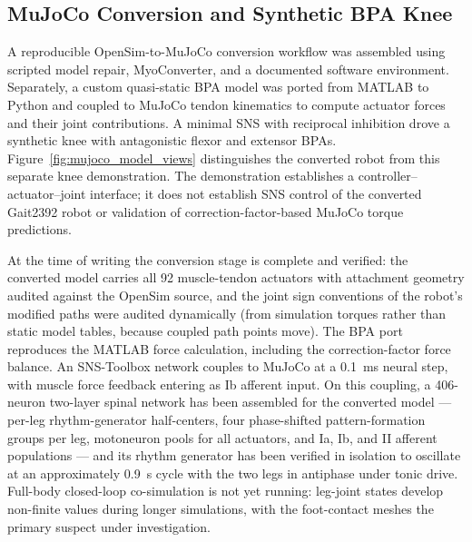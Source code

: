\subsection{MuJoCo Conversion and Synthetic BPA Knee}

A reproducible OpenSim-to-MuJoCo conversion workflow was assembled using scripted model repair, MyoConverter, and a documented software environment. Separately, a custom quasi-static BPA model was ported from MATLAB to Python and coupled to MuJoCo tendon kinematics to compute actuator forces and their joint contributions. A minimal SNS with reciprocal inhibition drove a synthetic knee with antagonistic flexor and extensor BPAs. Figure~\ref{fig:mujoco_model_views} distinguishes the converted robot from this separate knee demonstration. The demonstration establishes a controller--actuator--joint interface; it does not establish SNS control of the converted Gait2392 robot or validation of correction-factor-based MuJoCo torque predictions.

At the time of writing the conversion stage is complete and verified: the converted model carries all 92 muscle-tendon actuators with attachment geometry audited against the OpenSim source, and the joint sign conventions of the robot's modified paths were audited dynamically (from simulation torques rather than static model tables, because coupled path points move). The BPA port reproduces the MATLAB force calculation, including the correction-factor force balance. An SNS-Toolbox network couples to MuJoCo at a \qty{0.1}{\milli\second} neural step, with muscle force feedback entering as Ib afferent input. On this coupling, a 406-neuron two-layer spinal network has been assembled for the converted model --- per-leg rhythm-generator half-centers, four phase-shifted pattern-formation groups per leg, motoneuron pools for all actuators, and Ia, Ib, and II afferent populations --- and its rhythm generator has been verified in isolation to oscillate at an approximately \qty{0.9}{\second} cycle with the two legs in antiphase under tonic drive. Full-body closed-loop co-simulation is not yet running: leg-joint states develop non-finite values during longer simulations, with the foot-contact meshes the primary suspect under investigation.

